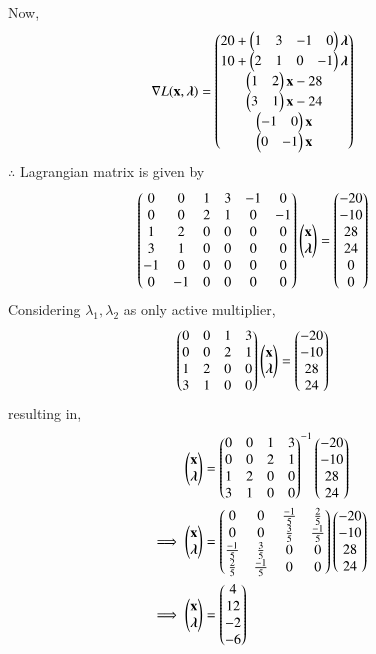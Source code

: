 Now,
\begin{align}
\nabla L(\mathbf{x},\boldsymbol{\lambda}) &= \begin{pmatrix}20+ \begin{pmatrix}1 & 3  & -1 & 0 \end{pmatrix}\boldsymbol{\lambda}\\ 10+\begin{pmatrix}2 & 1 & 0 & -1\end{pmatrix}\boldsymbol{\lambda} \\ \begin{pmatrix}1 & 2\end{pmatrix}\mathbf{x}-28 \\ \begin{pmatrix}3 & 1\end{pmatrix}\mathbf{x}-24 \\  \begin{pmatrix}-1 & 0\end{pmatrix}\mathbf{x} \\ \begin{pmatrix}0 & -1\end{pmatrix}\mathbf{x}\end{pmatrix}
\end{align}
$\therefore$ Lagrangian matrix is given by
\begin{align}
\begin{pmatrix}0 & 0 & 1 & 3 & -1 & 0 \\ 0 & 0 & 2 & 1  & 0 & -1 \\ 1 & 2 & 0 & 0 & 0 & 0 \\ 3 & 1 & 0 & 0 & 0 & 0  \\ -1 & 0 & 0 & 0 & 0 & 0  \\ 0 & -1 & 0 & 0 & 0 & 0 \end{pmatrix}\begin{pmatrix}\mathbf{x} \\ \boldsymbol{\lambda} \end{pmatrix} &= \begin{pmatrix}-20 \\ -10 \\ 28 \\ 24 \\ 0 \\0 \end{pmatrix}
\end{align}
Considering $\lambda_1,\lambda_2$ as only active multiplier,
\begin{align}
\begin{pmatrix}0 & 0 & 1 & 3 \\ 0 & 0 & 2 & 1 \\ 1 & 2 & 0 & 0 \\ 3 & 1 & 0 & 0\end{pmatrix}\begin{pmatrix}\mathbf{x}\\ \boldsymbol{\lambda}\end{pmatrix} &= \begin{pmatrix}-20 \\ -10 \\ 28 \\ 24\end{pmatrix}
\end{align}
resulting in,
\begin{align}
\begin{pmatrix}\mathbf{x} \\ \boldsymbol{\lambda}\end{pmatrix} &= \begin{pmatrix}0 & 0 & 1 & 3 \\ 0 & 0 & 2 & 1 \\ 1 & 2 & 0 & 0 \\ 3 & 1 & 0 & 0\end{pmatrix}^{-1}\begin{pmatrix}-20 \\ -10 \\ 28 \\ 24\end{pmatrix}
\\
\implies   \begin{pmatrix}\mathbf{x} \\ \boldsymbol{\lambda}\end{pmatrix} &= \begin{pmatrix}0 & 0 & \frac{-1}{5} & \frac{2}{5} \\ 0 & 0 & \frac{3}{5} & \frac{-1}{5} \\ \frac{-1}{5} & \frac{3}{5} & 0 & 0 \\ \frac{2}{5} & \frac{-1}{5} & 0 & 0\end{pmatrix}\begin{pmatrix}-20 \\ -10 \\ 28 \\ 24\end{pmatrix}
\\
\implies \begin{pmatrix}\mathbf{x} \\ \boldsymbol{\lambda}\end{pmatrix} &= \begin{pmatrix}4 \\ 12 \\ -2 \\ -6 \end{pmatrix}
\end{align}

